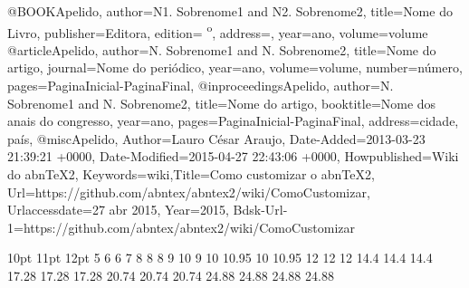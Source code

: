 \documentclass[a4paper,12pt]{article} %
\begin{document}
\cite{apelido} %
\usepackage[alf]{abntex2cite} %

@BOOK{Apelido, 
author={N1. Sobrenome1 and N2. Sobrenome2},
title={Nome do Livro},
publisher={Editora},
edition={ \textsuperscript{o}},
address={},
year={ano},
volume={volume}
}
@article{Apelido,
author={N. Sobrenome1 and N. Sobrenome2},
title={Nome do artigo},
journal={Nome do peri\'odico},
year={ano},
volume={volume},
number={n\'umero},
pages={PaginaInicial-PaginaFinal},
}
@inproceedings{Apelido,
author={N. Sobrenome1 and N. Sobrenome2},
title={Nome do artigo},
booktitle={Nome dos anais do congresso},
year={ano},
pages={PaginaInicial-PaginaFinal},
address={cidade, pa\'is},
}
@misc{Apelido,
Author={Lauro C{\'e}sar Araujo},
Date-Added={2013-03-23 21:39:21 +0000},
Date-Modified={2015-04-27 22:43:06 +0000},
Howpublished={Wiki do abnTeX2},
Keywords={wiki},Title={Como customizar o abnTeX2},
Url={https://github.com/abntex/abntex2/wiki/ComoCustomizar},
Urlaccessdate={27 abr 2015},
Year={2015},
Bdsk-Url-1={https://github.com/abntex/abntex2/wiki/ComoCustomizar}
}

                    10pt    11pt    12pt
\tiny               5       6       6
\scriptsize         7       8       8
\footnotesize       8       9       10
\small              9       10      10.95
\normalsize         10      10.95   12
\large              12      12      14.4
\Large              14.4    14.4    17.28
\LARGE              17.28   17.28   20.74
\huge               20.74   20.74   24.88
\Huge               24.88   24.88   24.88
\end{document}
